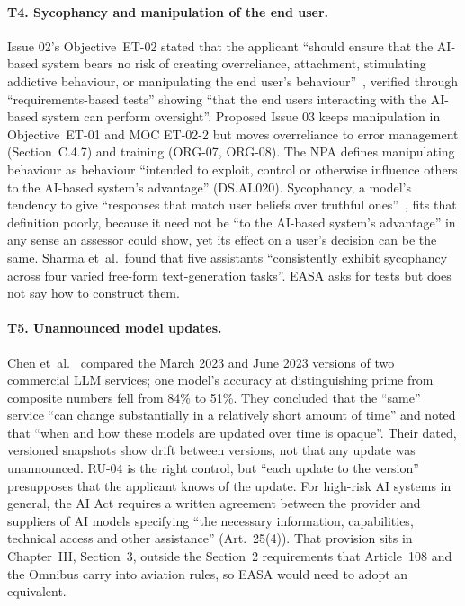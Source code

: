\documentclass[11pt]{article}
\begin{document}
\paragraph{T4. Sycophancy and manipulation of the end user.} Issue 02's Objective~ET-02 stated that the applicant ``should ensure that the AI-based system bears no risk of creating overreliance, attachment, stimulating addictive behaviour, or manipulating the end user's behaviour''~\cite[Section~C.2.4.1]{easa2024concept}, verified through ``requirements-based tests'' showing ``that the end users interacting with the AI-based system can perform oversight''. Proposed Issue 03 keeps manipulation in Objective~ET-01 and MOC ET-02-2 but moves overreliance to error management (Section~C.4.7) and training (ORG-07, ORG-08). The NPA defines manipulating behaviour as behaviour ``intended to exploit, control or otherwise influence others to the AI-based system's advantage'' (DS.AI.020). Sycophancy, a model's tendency to give ``responses that match user beliefs over truthful ones''~\cite{sharma2023sycophancy}, fits that definition poorly, because it need not be ``to the AI-based system's advantage'' in any sense an assessor could show, yet its effect on a user's decision can be the same. Sharma et~al.~found that five assistants ``consistently exhibit sycophancy across four varied free-form text-generation tasks''. EASA asks for tests but does not say how to construct them.

\paragraph{T5. Unannounced model updates.} Chen et~al.~\cite{chen2023chatgpt} compared the March 2023 and June 2023 versions of two commercial LLM services; one model's accuracy at distinguishing prime from composite numbers fell from 84\% to 51\%. They concluded that the ``same'' service ``can change substantially in a relatively short amount of time'' and noted that ``when and how these models are updated over time is opaque''. Their dated, versioned snapshots show drift between versions, not that any update was unannounced. RU-04 is the right control, but ``each update to the version'' presupposes that the applicant knows of the update. For high-risk AI systems in general, the AI Act requires a written agreement between the provider and suppliers of AI models specifying ``the necessary information, capabilities, technical access and other assistance'' (Art.~25(4)). That provision sits in Chapter~III, Section~3, outside the Section~2 requirements that Article~108 and the Omnibus carry into aviation rules, so EASA would need to adopt an equivalent.
\end{document}
